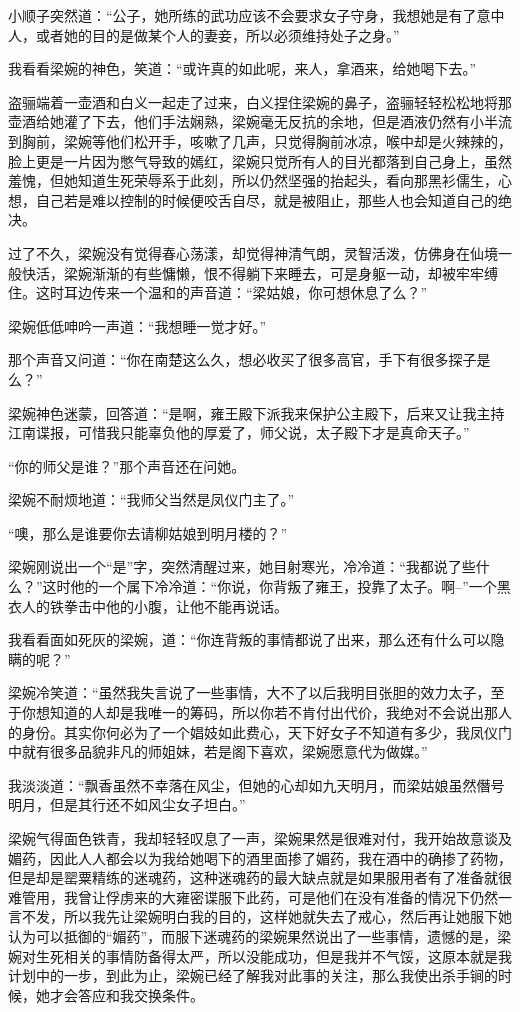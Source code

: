 小顺子突然道：“公子，她所练的武功应该不会要求女子守身，我想她是有了意中人，或者她的目的是做某个人的妻妾，所以必须维持处子之身。”

我看看梁婉的神色，笑道：“或许真的如此呢，来人，拿酒来，给她喝下去。”

盗骊端着一壶酒和白义一起走了过来，白义捏住梁婉的鼻子，盗骊轻轻松松地将那壶酒给她灌了下去，他们手法娴熟，梁婉毫无反抗的余地，但是酒液仍然有小半流到胸前，梁婉等他们松开手，咳嗽了几声，只觉得胸前冰凉，喉中却是火辣辣的，脸上更是一片因为憋气导致的嫣红，梁婉只觉所有人的目光都落到自己身上，虽然羞愧，但她知道生死荣辱系于此刻，所以仍然坚强的抬起头，看向那黑衫儒生，心想，自己若是难以控制的时候便咬舌自尽，就是被阻止，那些人也会知道自己的绝决。

过了不久，梁婉没有觉得春心荡漾，却觉得神清气朗，灵智活泼，仿佛身在仙境一般快活，梁婉渐渐的有些慵懒，恨不得躺下来睡去，可是身躯一动，却被牢牢缚住。这时耳边传来一个温和的声音道：“梁姑娘，你可想休息了么？”

梁婉低低呻吟一声道：“我想睡一觉才好。”

那个声音又问道：“你在南楚这么久，想必收买了很多高官，手下有很多探子是么？”

梁婉神色迷蒙，回答道：“是啊，雍王殿下派我来保护公主殿下，后来又让我主持江南谍报，可惜我只能辜负他的厚爱了，师父说，太子殿下才是真命天子。”

“你的师父是谁？”那个声音还在问她。

梁婉不耐烦地道：“我师父当然是凤仪门主了。”

“噢，那么是谁要你去请柳姑娘到明月楼的？”

梁婉刚说出一个“是”字，突然清醒过来，她目射寒光，冷冷道：“我都说了些什么？”这时他的一个属下冷冷道：“你说，你背叛了雍王，投靠了太子。啊--”一个黑衣人的铁拳击中他的小腹，让他不能再说话。

我看看面如死灰的梁婉，道：“你连背叛的事情都说了出来，那么还有什么可以隐瞒的呢？”

梁婉冷笑道：“虽然我失言说了一些事情，大不了以后我明目张胆的效力太子，至于你想知道的人却是我唯一的筹码，所以你若不肯付出代价，我绝对不会说出那人的身份。其实你何必为了一个娼妓如此费心，天下好女子不知道有多少，我凤仪门中就有很多品貌非凡的师姐妹，若是阁下喜欢，梁婉愿意代为做媒。”

我淡淡道：“飘香虽然不幸落在风尘，但她的心却如九天明月，而梁姑娘虽然僭号明月，但是其行还不如风尘女子坦白。”

梁婉气得面色铁青，我却轻轻叹息了一声，梁婉果然是很难对付，我开始故意谈及媚药，因此人人都会以为我给她喝下的酒里面掺了媚药，我在酒中的确掺了药物，但是却是罂粟精练的迷魂药，这种迷魂药的最大缺点就是如果服用者有了准备就很难管用，我曾让俘虏来的大雍密谍服下此药，可是他们在没有准备的情况下仍然一言不发，所以我先让梁婉明白我的目的，这样她就失去了戒心，然后再让她服下她认为可以抵御的“媚药”，而服下迷魂药的梁婉果然说出了一些事情，遗憾的是，梁婉对生死相关的事情防备得太严，所以没能成功，但是我并不气馁，这原本就是我计划中的一步，到此为止，梁婉已经了解我对此事的关注，那么我使出杀手锏的时候，她才会答应和我交换条件。

